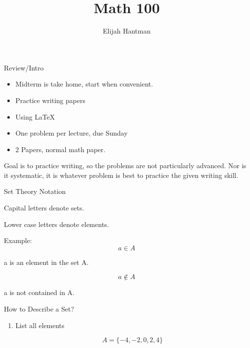\documentclass{report}
\title{\Huge{Math 100}}
\author{\huge{Elijah Hantman}}
\date{}
\begin{document}
\maketitle
\newpage

\begin{description}
   \item 
       {\Large Review/Intro }

       \begin{itemize}
           \item Midterm is take home, start when convenient.
           \item Practice writing papers
           \item Using \LaTeX
           \item One problem per lecture, due Sunday
           \item 2 Papers, normal math paper.
       \end{itemize}

       Goal is to practice writing, so the problems are not
       particularly advanced. Nor is it systematic, it is
       whatever problem is best to practice the given writing
       skill.
    \item
        {\Large Set Theory Notation}

        \begin{mdframed}
            Capital letters denote sets.

            Lower case letters denote elements.
        \end{mdframed}

        Example:
        \begin{displaymath}
         a \in A
        \end{displaymath}

        a is an element in the set A.

        \begin{displaymath}
        a \notin A 
        \end{displaymath}

        a is not contained in A.

        {\large How to Describe a Set?}
        \begin{enumerate}
            \item List all elements

                \begin{displaymath}
                 A = \{ -4, -2, 0, 2, 4 \}
                \end{displaymath}


\end{enumerate}
\end{description}
\end{document}
